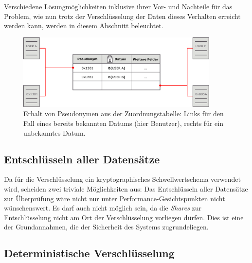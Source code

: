 Verschiedene Lösungmöglichkeiten inklusive ihrer Vor- und Nachteile für das Problem, wie nun trotz der Verschlüsselung der Daten dieses Verhalten erreicht werden kann, werden in diesem Abschnitt beleuchtet.

\begin{figure}[]
    \centering
        \includegraphics[width=0.9\textwidth]{dia/se_overview.pdf}
    \caption{Erhalt von Pseudonymen aus der Zuordnungstabelle: Links für den Fall eines bereits bekannten Datums (hier Benutzer), rechts für ein unbekanntes Datum.}
    \label{fig:se_overview}
\end{figure}

\subsection{Entschlüsseln aller Datensätze}

Da für die Verschlüsselung ein kryptographisches Schwellwertschema verwendet wird, scheiden zwei triviale Möglichkeiten aus: Das Entschlüsseln aller Datensätze zur Überprüfung wäre nicht nur unter Performance-Gesichtspunkten nicht wünschenswert. Es darf auch nicht möglich sein, da die \textit{Shares} zur Entschlüsselung nicht am Ort der Verschlüsselung vorliegen dürfen. Dies ist eine der Grundannahmen, die der Sicherheit des Systems zugrundeliegen. 

\subsection{Deterministische Verschlüsselung}

